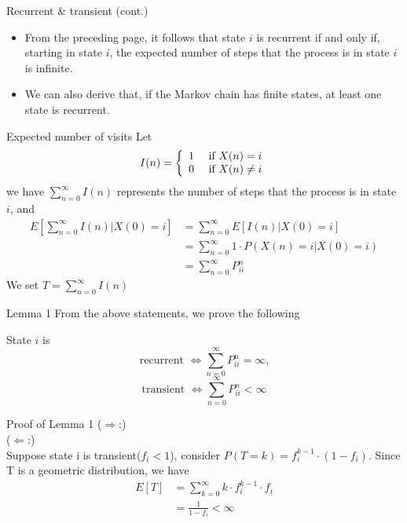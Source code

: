 \documentclass[mathserif]{beamer}
\begin{document}
\begin{frame}{Recurrent \& transient (cont.)}
	\begin{itemize}
	\item From the preceding page, it follows that state $i$ is recurrent if and only if,
		starting in state $i$, the expected number of steps that the process is in state $i$ is infinite.
	\item We can also derive that, if the Markov chain has finite states, at least one state is recurrent.
	\end{itemize}
\end{frame}

\begin{frame}{Expected number of visits}
	Let 
	\[
	I(n) = \left\{
	\begin{array}{l l}
		1 & ~\text{if $X(n) = i$}\\
		0 & ~\text{if $X(n) \neq i$} \\
	\end{array} \right.
	\]
	we have $\sum_{n=0}^\infty I(n)$ represents the number of steps that the process is in state $i$, and
	\begin{align*}
	E\left[ \sum_{n=0}^\infty I(n)|X(0) = i \right] & = \sum_{n=0}^\infty E[I(n)|X(0)=i] \\
	& = \sum_{n=0}^\infty 1 \cdot P(X(n)=i|X(0)=i) \\
	& = \sum_{n=0}^\infty P^n_{ii}
	\end{align*}
	We set $T = \sum_{n=0}^\infty I(n)$
\end{frame}

\begin{frame}{Lemma 1}
	From the above statements, we prove the following
	\begin{lemma}
	State $i$ is 
	\[
	\text{recurrent } \iff \sum_{n=0}^\infty P^n_{ii} = \infty \text{,}
	\]
	\[
	\text{transient } \iff \sum_{n=0}^\infty P^n_{ii} < \infty
	\]
	\end{lemma}
\end{frame}

\begin{frame}{Proof of Lemma 1}
	($\Rightarrow$:)\\
	($\Leftarrow$:)\\
	Suppose state i is transient($f_i < 1$), consider $P(T=k) = f_i^{k-1} \cdot (1-f_i)$. Since T is a geometric distribution, we have
	\begin{align*}
		E[T] 	&= \sum_{k = 0}^\infty k \cdot f_i^{k-1} \cdot f_i \\
			&=\frac{1}{1-f_i} < \infty
	\end{align*}
\end{frame}
\end{document}
